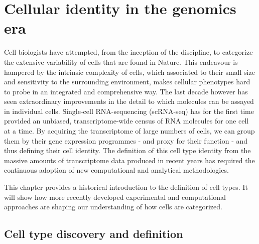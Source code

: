 
\chapter{Cellular identity in the genomics era}  %

\ifpdf
    \graphicspath{{Chapter1/Figs/Raster/}{Chapter1/Figs/PDF/}{Chapter1/Figs/}}
\else
    \graphicspath{{Chapter1/Figs/Vector/}{Chapter1/Figs/}}
\fi

Cell biologists have attempted, from the inception of the discipline, to categorize the extensive variability of cells that are found in Nature. This endeavour is hampered by the intrinsic complexity of cells, which associated to their small size and sensitivity to the surrounding environment, makes cellular phenotypes hard to probe in an integrated and comprehensive way. The last decade however has seen extraordinary improvements in the detail to which molecules can be assayed in individual cells. Single-cell RNA-sequencing (scRNA-seq) has for the first time provided an unbiased, transcriptome-wide census of RNA molecules for one cell at a time. By acquiring the transcriptome of large numbers of cells, we can group them by their gene expression programmes - and proxy for their function - and thus defining their cell identity. The definition of this cell type identity from the massive amounts of transcriptome data produced in recent years has required the continuous adoption of new computational and analytical methodologies.

This chapter provides a historical introduction to the definition of cell types. It will show how more recently developed experimental and computational approaches are shaping our understanding of how cells are categorized.



\section{Cell type discovery and definition} %
\label{section1.1}

